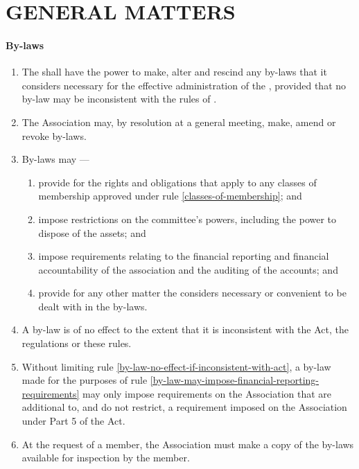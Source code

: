 \documentclass[../constitution.tex]{subfiles}
\begin{document}
\hypertarget{part-8-general-matters}{%
\part{GENERAL MATTERS}\label{part-8-general-matters}}

\hypertarget{by-laws}{%
\subsection{By-laws}\label{by-laws}}

\begin{enumerate}

\item The  shall have the power to make, alter and rescind any by-laws that it considers necessary for the effective administration of the , provided that no by-law may be inconsistent with the rules of .  
\item The Association may, by resolution at a general meeting, make, amend or revoke by-laws.
\item By-laws may ---

  \begin{enumerate}
  
  \item provide for the rights and obligations that apply to any classes of membership approved under rule \ref{classes-of-membership}; and
  \item impose restrictions on the committee's powers, including the power to dispose of the  assets; and
  \item impose requirements relating to the financial reporting and financial accountability of the association and the auditing of the  accounts; and \label{by-law-may-impose-financial-reporting-requirements}
  \item provide for any other matter the  considers necessary or convenient to be dealt with in the by-laws.
  \end{enumerate}
\item A by-law is of no effect to the extent that it is inconsistent with the Act, the regulations or these rules. \label{by-law-no-effect-if-inconsistent-with-act}
\item Without limiting rule \ref{by-law-no-effect-if-inconsistent-with-act}, a by-law made for the purposes of rule \ref{by-law-may-impose-financial-reporting-requirements} may only impose requirements on the Association that are additional to, and do not restrict, a requirement imposed on the Association under Part 5 of the Act.
\item At the request of a member, the Association must make a copy of the by-laws available for inspection by the member.
\end{enumerate}
\end{document}
